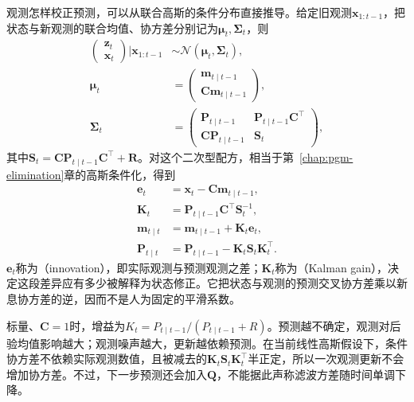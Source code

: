 观测怎样校正预测，可以从联合高斯的条件分布直接推导。给定旧观测$\bm{x}_{1:t-1}$，把状态与新观测的联合均值、协方差分别记为$\bm\mu_t,\bm\Sigma_t$，则
\begin{equation}
  \begin{aligned}
    \begin{pmatrix}\bm{z}_t\\\bm{x}_t\end{pmatrix}
      \mathrel{\Big|}\bm{x}_{1:t-1}
      &\sim\mathcal{N}(\bm\mu_t,\bm\Sigma_t),\\
    \bm\mu_t&=
      \begin{pmatrix}
        \bm{m}_{t\mid t-1}\\
        \bm{C}\bm{m}_{t\mid t-1}
      \end{pmatrix},\\
    \bm\Sigma_t&=
      \begin{pmatrix}
        \bm{P}_{t\mid t-1}&\bm{P}_{t\mid t-1}\bm{C}^{\top}\\
        \bm{C}\bm{P}_{t\mid t-1}&\bm{S}_t
      \end{pmatrix},
  \end{aligned}
  \label{eq:pgm-dynamic-kalman-joint}
\end{equation}
其中$\bm{S}_t=\bm{C}\bm{P}_{t\mid t-1}\bm{C}^{\top}+\bm{R}$。对这个二次型配方，相当于第~\ref{chap:pgm-elimination}章的高斯条件化，得到
\begin{equation}
  \begin{aligned}
    \bm{e}_t&=\bm{x}_t-\bm{C}\bm{m}_{t\mid t-1},\\
    \bm{K}_t&=\bm{P}_{t\mid t-1}\bm{C}^{\top}\bm{S}_t^{-1},\\
    \bm{m}_{t\mid t}
      &=\bm{m}_{t\mid t-1}+\bm{K}_t\bm{e}_t,\\
    \bm{P}_{t\mid t}
      &=\bm{P}_{t\mid t-1}
        -\bm{K}_t\bm{S}_t\bm{K}_t^{\top}.
  \end{aligned}
  \label{eq:pgm-dynamic-kalman-update}
\end{equation}
$\bm{e}_t$称为（innovation），即实际观测与预测观测之差；$\bm{K}_t$称为（Kalman gain），决定这段差异应有多少被解释为状态修正。它把状态与观测的预测交叉协方差乘以新息协方差的逆，因而不是人为固定的平滑系数。

标量、$\bm{C}=1$时，增益为$K_t=P_{t\mid t-1}/(P_{t\mid t-1}+R)$。预测越不确定，观测对后验均值影响越大；观测噪声越大，更新越依赖预测。在当前线性高斯假设下，条件协方差不依赖实际观测数值，且被减去的$\bm{K}_t\bm{S}_t\bm{K}_t^\top$半正定，所以一次观测更新不会增加协方差。不过，下一步预测还会加入$\bm{Q}$，不能据此声称滤波方差随时间单调下降。

